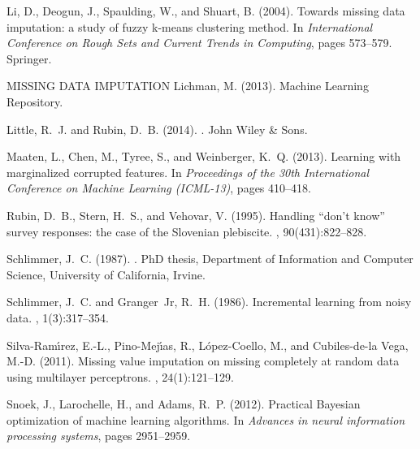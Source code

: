 \documentclass[10pt]{book}
\theoremstyle{definition}
\begin{document}
\begin{thebibliography}{11}
Li, D., Deogun, J., Spaulding, W., and Shuart, B. (2004).
\newblock Towards missing data imputation: a study of fuzzy k-means clustering
  method.
\newblock In {\em International Conference on Rough Sets and Current Trends in
  Computing}, pages 573--579. Springer.

{\hfill {\footnotesize\rm MISSING DATA IMPUTATION} \hfill}
Lichman, M. (2013).
 {M}achine {L}earning {R}epository.

Little, R.~J. and Rubin, D.~B. (2014).
.
\newblock John Wiley \& Sons.

Maaten, L., Chen, M., Tyree, S., and Weinberger, K.~Q. (2013).
\newblock Learning with marginalized corrupted features.
\newblock In {\em Proceedings of the 30th International Conference on Machine
  Learning (ICML-13)}, pages 410--418.

Rubin, D.~B., Stern, H.~S., and Vehovar, V. (1995).
\newblock Handling \enquote{don't know} survey responses: the case of the
  {S}lovenian plebiscite.
,
  90(431):822--828.

Schlimmer, J.~C. (1987).
.
\newblock PhD thesis, Department of Information and Computer Science,
  University of California, Irvine.

Schlimmer, J.~C. and Granger~Jr, R.~H. (1986).
\newblock Incremental learning from noisy data.
, 1(3):317--354.

Silva-Ram{\'\i}rez, E.-L., Pino-Mej{\'\i}as, R., L{\'o}pez-Coello, M., and
  Cubiles-de-la Vega, M.-D. (2011).
\newblock Missing value imputation on missing completely at random data using
  multilayer perceptrons.
, 24(1):121--129.

Snoek, J., Larochelle, H., and Adams, R.~P. (2012).
\newblock Practical {B}ayesian optimization of machine learning algorithms.
\newblock In {\em Advances in neural information processing systems}, pages
  2951--2959.


\end{thebibliography}
\end{document}
